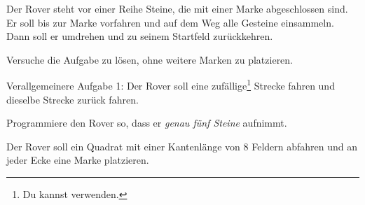 \documentclass[10pt, a4paper]{scrartcl}
\begin{document}
\vspace{1cm}
\begin{aufgabe}
	Der Rover steht vor einer Reihe Steine, die mit einer Marke abgeschlossen sind. Er soll bis zur Marke vorfahren und auf dem Weg alle Gesteine einsammeln. Dann soll er umdrehen und zu seinem Startfeld zurückkehren.
	
	Versuche die Aufgabe zu lösen, ohne weitere Marken zu platzieren.
\end{aufgabe}

\begin{aufgabe}
	Verallgemeinere Aufgabe 1: Der Rover soll eine zufällige\footnote{Du kannst  verwenden.} Strecke fahren und dieselbe Strecke zurück fahren.
\end{aufgabe}

\begin{aufgabe}
	Programmiere den Rover so, dass er \emph{genau fünf Steine} aufnimmt.
\end{aufgabe}

\begin{aufgabe}
	Der Rover soll ein Quadrat mit einer Kantenlänge von 8 Feldern abfahren und an jeder Ecke eine Marke platzieren.
\end{aufgabe}
\end{document}
